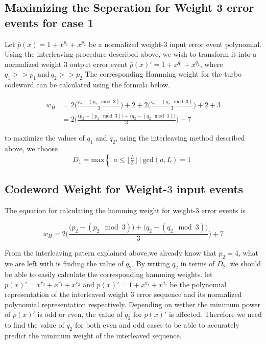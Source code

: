 \documentclass[11pt, oneside, dvipdfmx]{book}
\begin{document}
 
 \subsection{Maximizing the Seperation for Weight 3 error events for case 1}
Let $\bar{p}(x)=1+x^{p_1}+x^{p_2}$ be a normalized weight-$3$ input error event polynomial. Using the interleaving procedure described above, we wish to transform it into a normalized weight $3$ output error event $\bar{p}(x)'=1+x^{q_1}+x^{q_2}$, where $q_1>>p_1~\text{and}~q_2>>p_2$ The corresponding Hamming weight for the turbo codeword can be calculated using the formula below.

\begin{equation}
\begin{split}
w_H &= 2\Bigg(\frac{p_2-(p_2\mod 3)}{3}  \Bigg)+2+2\Bigg(\frac{q_2-(q_2\mod 3)}{3}  \Bigg)+2+3\\
&=2\Bigg(\frac{\Big(p_2-(p_2\mod 3)  \Big) + \Big( q_2-(q_2\mod 3) \Big)}{3}  \Bigg)+7
\end{split}
\end{equation}

to maximize the values of $q_1$ and $q_2$, using the interleaving method described above, we choose $$ D_1=\text{max} \begin{cases}
       a\leq\lfloor\frac{L}{3}\rfloor ~|~ \text{gcd}(a,L)=1
    \end{cases}
$$
 
 \subsection{Codeword Weight for Weight-$3$ input events}
 The equation for calculating the hamming weight for weight-$3$ error events is
 
 \begin{equation}
w_H =2\Bigg(\frac{\Big(p_2-(p_2\mod 3)  \Big) + \Big( q_2-(q_2\mod 3) \Big)}{3}  \Bigg)+7
\end{equation} 

From the interleaving patern explained above,we already know that $p_2=4$, what we are left with is finding the value of $q_2$. By writing $q_2$ in terms of $D_2$, we should be able to easily calculate the corresponding hamming weights. let $p(x)'=x^{r_0}+x^{r_1}+x^{r_2}$ and $\bar{p}(x)'=1+x^{q_1}+x^{q_2}$ be the polynomial representation of the interleaved weight $3$ error sequence and its normalized polynomial representation respectively. Depending on wether the minimum power of $p(x)'$ is odd or even, the value of $q_2$ for $\bar{p}(x)'$ is affected. Therefore we need to find the value of $q_2$ for both even and odd cases to be able to accurately predict the minimum weight of the interleaved sequence.
\end{document}
